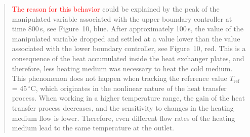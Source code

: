 \documentclass[a4paper,10pt]{article}
\newcommand{\change}[1]{\textcolor{red}{#1}}
\begin{document}
{\begin{quote}
			\change{The reason for this behavior} could be explained by the peak of the manipulated variable associated with the upper boundary controller at time 800\,s, see Figure~10, blue. After approximately 100\,s, the value of the manipulated variable dropped and settled at a value lower than the value associated with the lower boundary controller, see Figure~10, red. This is a consequence of the heat accumulated inside the heat exchanger plates, and therefore, less heating medium was necessary to heat the cold medium. This phenomenon does not happen when tracking the reference value $T_{\mathrm{ref}}$ = 45\,$^{\circ}\mathrm{C}$, which originates in the nonlinear nature of the heat transfer process. When working in a higher temperature range, the gain of the heat transfer process decreases, and the sensitivity to changes in the heating medium flow is lower. Therefore, even different flow rates of the heating medium lead to the same temperature at the outlet.
		\end{quote}
		

		
		  
		
		
		
		
		
}
\end{document}
